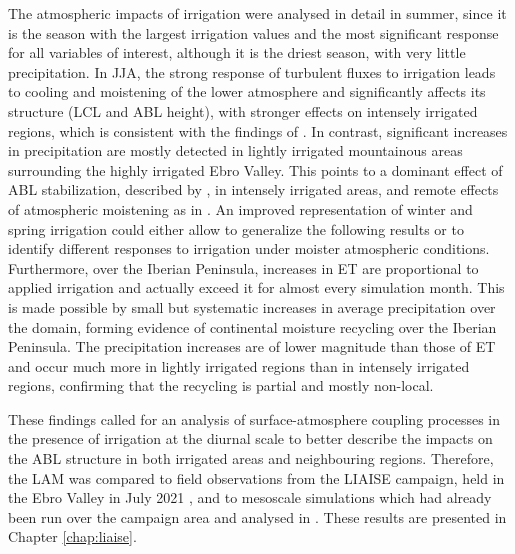 The atmospheric impacts of irrigation were analysed in detail in summer, since it is the season with the largest irrigation values and the most significant response for all variables of interest, although it is the driest season, with very little precipitation. 
In JJA, the strong response of turbulent fluxes to irrigation leads to cooling and moistening of the lower atmosphere and significantly affects its structure (LCL and ABL height), with stronger effects on intensely irrigated regions, which is consistent with the findings of \citet{rappin_landatmosphere_2022}. In contrast, significant increases in precipitation are mostly detected in lightly irrigated mountainous areas surrounding the highly irrigated Ebro Valley. This points to a dominant effect of ABL stabilization, described by \citet{findell_atmospheric_2003-1, ek_influence_2004}, in intensely irrigated areas, and remote effects of atmospheric moistening as in \citet{deangelis_evidence_2010, lo_irrigation_2013, yang_impact_2017}. 
An improved representation of winter and spring irrigation could either allow to generalize the following results or to identify different responses to irrigation under moister atmospheric conditions.
Furthermore, over the Iberian Peninsula, increases in ET are proportional to applied irrigation and actually exceed it for almost every simulation month. This is made possible by small but systematic increases in average precipitation over the domain, forming evidence of continental moisture recycling over the Iberian Peninsula. The precipitation increases are of lower magnitude than those of ET and occur much more in lightly irrigated regions than in intensely irrigated regions, confirming that the recycling is partial and mostly non-local.

These findings called for an analysis of surface-atmosphere coupling processes in the presence of irrigation at the diurnal scale to better describe the impacts on the ABL structure in both irrigated areas and neighbouring regions.
Therefore, the LAM was compared to field observations from the LIAISE campaign, held in the Ebro Valley in July 2021 \citep{boone_land_2025}, and to mesoscale simulations which had already been run over the campaign area and analysed in \citet{lunel_irrigation_2024,lunel_marinada_2024}. These results are presented in Chapter \ref{chap:liaise}.


